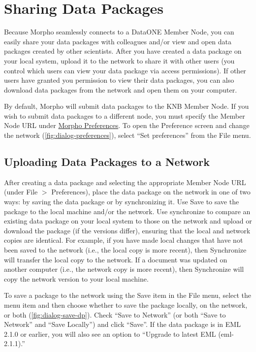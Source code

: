 \section{Sharing Data Packages} \label{sec:sharing}

Because Morpho seamlessly connects to a DataONE Member Node, you can easily share
your data packages with colleagues and/or view and open data packages
created by other scientists. After you have created a data package on
your local system, upload it to the network to share it with other users
(you control which users can view your data package via access
permissions). If other users have granted you permission to view their
data packages, you can also download data packages from the network and
open them on your computer.

By default, Morpho will submit data packages to the KNB Member Node.
If you wish to submit data packages to a different node, you must
specify the Member Node URL under \hyperref[sec:preferences]{Morpho
Preferences}. To open the Preference screen and change the network
(\autoref{fig:dialog-preferences}), select ``Set preferences'' from the
File menu.

\subsection{Uploading Data Packages to a Network} \label{sec:uploading}

After creating a data package and selecting the appropriate Member Node URL 
(under File $>$ Preferences), place the data package on the network in one of two
ways: by saving the data package or by synchronizing it. Use Save to
save the package to the local machine and/or the network. Use
synchronize to compare an existing data package on your local system to
those on the network and upload or download the package (if the versions
differ), ensuring that the local and network copies are identical. For
example, if you have made local changes that have not been saved to the
network (i.e., the local copy is more recent), then Synchronize will
transfer the local copy to the network. If a document was updated on
another computer (i.e., the network copy is more recent), then
Synchronize will copy the network version to your local machine.

To save a package to the network using the Save item in the File menu,
select the menu item and then choose whether to save the package
locally, on the network, or both (\autoref{fig:dialog-save-dp}).  Check
``Save to Network'' (or both ``Save to Network'' and ``Save Locally'')
and click ``Save''. If the data package is in EML 2.1.0 or earlier, you
will also see an option to ``Upgrade to latest EML (eml-2.1.1).'' 

